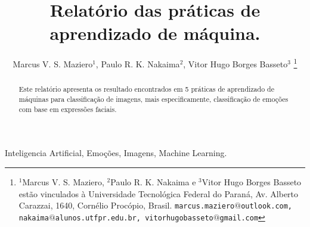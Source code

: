 \documentclass[a4paper, 12 pt, conference]{ieeeconf}  %
\title{\LARGE \bf
Relatório das práticas de aprendizado de máquina.
}
\author{Marcus V. S. Maziero$^{1}$, Paulo R. K. Nakaima$^{2}$, Vitor Hugo Borges Basseto$^{3}$%
\thanks{$^{1}$Marcus V. S. Maziero, $^{2}$Paulo R. K. Nakaima e $^{3}$Vitor Hugo Borges Basseto estão vinculados à Universidade Tecnológica Federal do Paraná, Av. Alberto Carazzai, 1640, Cornélio Procópio, Brasil. 
        {\tt\small marcus.maziero$@$outlook.com, nakaima$@$alunos.utfpr.edu.br, vitorhugobasseto$@$gmail.com}}%
}
\begin{document}
\maketitle
\thispagestyle{empty}
\pagestyle{empty}

\begin{abstract}
	Este relatório apresenta os resultado encontrados em 5 práticas de aprendizado de máquinas para classificação de imagens, mais especificamente, classificação de emoções com base em expressões faciais.
\end{abstract}

\begin{keywords}
	Inteligencia Artificial, Emoções, Imagens, Machine Learning.
\end{keywords}


%
%
%
%
\end{document}
